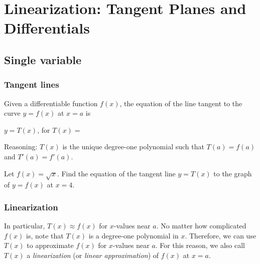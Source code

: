 \newlecture
\setcounter{section}{3}

\def\coursetopicnumber{II}
\def\topic{Linearization: Tangent Planes and Differentials} %
\def\shorttopic{Linearization: tangent planes} %
\def\textbookname{Active Calculus} %
\def\shorttextbookname{AC} %
\def\textbooksection{10.4} %
\def\textbooksectionurl{https://activecalculus.org/vector/S-10-4-Linearization.html} %
\def\handoutday{} %


\thispagestyle{plain}
\topstuff
\section{\topic{} \booklink{}}
\label{sec:linearization}
\subsection{Single variable}
\subsubsection{Tangent lines}
Given a differentiable function $f(x)$, the equation of the line tangent to the curve $y=f(x)$ at $x=a$ is 
\bigskip 

\noindent $y=T(x)$, for  $T(x)=\phantom{f(a)+f'(a)\cdot (x-a).}$
\vfill

\noindent Reasoning: $T(x)$ is the unique degree-one polynomial such that $T(a)=f(a)$ and $T'(a)=f'(a)$.
\begin{ex}
    Let $f(x)=\sqrt{x}$. Find the equation of the tangent line $y=T(x)$ to the graph of $y=f(x)$ at $x=4$. 
\end{ex}

\vfill

\subsubsection{Linearization}
In particular, $T(x)\approx f(x)$ for $x$-values near $a$. No matter how complicated $f(x)$ is, note that $T(x)$ is a degree-one polynomial in $x$. Therefore, we can use $T(x)$ to approximate $f(x)$ for $x$-values near $a$. For this reason, we also call $T(x)$ a \emph{linearization} (or \emph{linear approximation}) of $f(x)$ at $x=a$.

